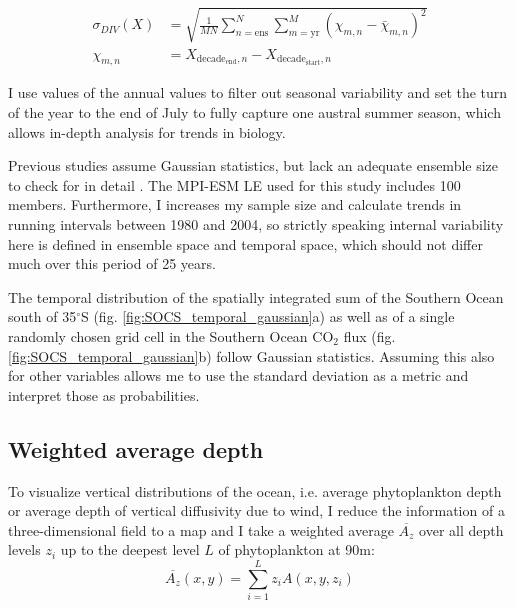 \begin{align*}
\sigma_{DIV}(X) &= \sqrt{\frac{1}{M N} \sum_{n=\text{ens}}^{N} \sum_{m=\text{yr}}^{M} \left( \chi_{m,n} -\bar{\chi}_{m,n}\right)^{2}} \\
\chi_{m,n}&=X_{\text{decade}_{\text{end}},n}-X_{\text{decade}_{\text{start}},n}
\end{align*}


I use values of the annual values to filter out seasonal variability and set the turn of the year to the end of July to fully capture one austral summer season, which allows in-depth analysis for trends in biology.\newline

Previous studies assume Gaussian statistics, but lack an adequate ensemble size to check for in detail \citep{Deser2012,Thompson2015}. The \ac{MPI-ESM LE} used for this study includes 100 members. Furthermore, I increases my sample size and calculate trends in running intervals between 1980 and 2004, so strictly speaking internal variability here is defined in ensemble space and temporal space, which should not differ much over this period of 25 years.

The temporal distribution of the spatially integrated sum of the  Southern Ocean south of 35$^\circ$S (fig. \ref{fig:SOCS_temporal_gaussian}a) as well as of a single randomly chosen grid cell in the Southern Ocean CO$_2$ flux (fig. \ref{fig:SOCS_temporal_gaussian}b) follow Gaussian statistics. Assuming this also for other variables allows me to use the standard deviation as a metric and interpret those as probabilities.






\subsection{Weighted average depth}
To visualize vertical distributions of the ocean, i.e. average phytoplankton depth or average depth of vertical diffusivity due to wind, I reduce the information of a three-dimensional field to a map and I take a weighted average $\overline{A_z}$ over all depth levels $z_i$ up to the deepest level $L$ of phytoplankton at 90m: \[ \overline{A_z}(x,y)=\sum_{i=1}^L z_i A(x,y,z_i) \]

